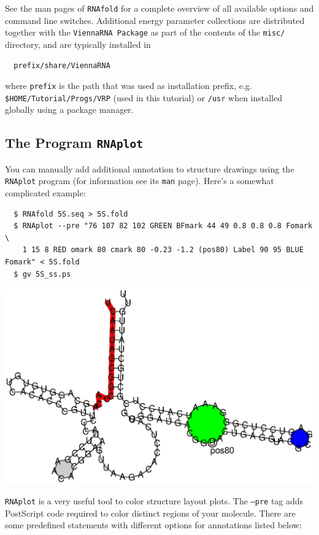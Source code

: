 \documentclass[a4paper]{article}
\begin{document}
See the man pages of \texttt{RNAfold} for a complete overview of all available options
and command line switches. Additional energy parameter collections are distributed together
with the \texttt{ViennaRNA Package} as part of the contents of the \texttt{misc/} directory,
and are typically installed in
\begin{verbatim}
  prefix/share/ViennaRNA
\end{verbatim}
where \texttt{prefix} is the path that was used as installation prefix, e.g.
\texttt{\$HOME/Tutorial/Progs/VRP} (used in this tutorial) or \texttt{/usr} when installed
globally using a package manager.


\subsection{The Program \texttt{RNAplot}}
You can manually add additional annotation to structure drawings using the \texttt{RNAplot}
program (for information see its \texttt{man} page). Here's a somewhat complicated example:

\begin{verbatim}
  $ RNAfold 5S.seq > 5S.fold
  $ RNAplot --pre "76 107 82 102 GREEN BFmark 44 49 0.8 0.8 0.8 Fomark \
    1 15 8 RED omark 80 cmark 80 -0.23 -1.2 (pos80) Label 90 95 BLUE Fomark" < 5S.fold
  $ gv 5S_ss.ps
\end{verbatim}%
\begin{center}
\includegraphics[width=.75\textwidth]{Figures/5S_ss.eps}\\
\end{center}

\texttt{RNAplot} is a very useful tool to color structure layout plots. The \texttt{--pre} tag adds
PostScript code required to color distinct regions of your molecule. There are some predefined 
statements with different options for annotations listed below:
\end{document}
